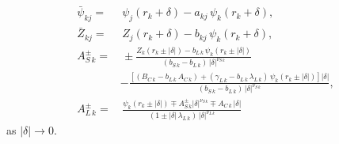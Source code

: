 \documentclass[12pt,prb,aps,notitlepage]{revtex4-1}
\begin{document}
\begin{align}
\bar{\psi}_{kj} =&\, \psi_{j}(r_k+\delta) - a_{kj}\,\psi_k(r_k+\delta),\\[0.5ex]
\bar{Z}_{kj}=&\, Z_{j}(r_k+\delta) - b_{kj}\,\psi_k(r_k+\delta),\\[0.5ex]
A_{S\,k}^\pm =&\, \pm\frac{Z_k(r_k\pm|\delta|)- b_{L\,k}\,\psi_k(r_k\pm|\delta|)}{(b_{S\,k}-b_{L\,k})\,|\delta|^{\nu_{S\,k}}}\nonumber\\[0.5ex]& -\frac{\left[(B_{C\,k}-b_{L\,k}\,A_{C\,k})+(\gamma_{L\,k}-b_{L\,k}\,\lambda_{L\,k})\,\psi_k(r_k\pm |\delta|)\right]|\delta|}{(b_{S\,k}-b_{L\,k})\,|\delta|^{\nu_{S\,k}}},\\[0.5ex]
A_{L\,k}^\pm =&\, \frac{\psi_k(r_k\pm|\delta|)\mp A_{S\,k}^\pm |\delta|^{\nu_{S\,k}}\mp A_{C\,k}\,|\delta|}{(1\pm |\delta|\,\lambda_{L\,k})\,|\delta|^{\nu_{L\,k}}}
\end{align}
as $|\delta|\rightarrow 0$.
\end{document}
